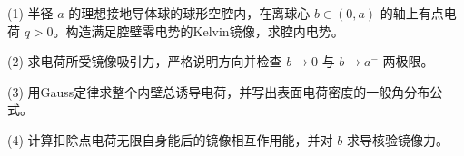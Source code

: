 (1) 半径 \(a\) 的理想接地导体球的球形空腔内，在离球心 \(b\in(0,a)\) 的轴上有点电荷 \(q>0\)。构造满足腔壁零电势的Kelvin镜像，求腔内电势。

(2) 求电荷所受镜像吸引力，严格说明方向并检查 \(b\to0\) 与 \(b\to a^-\) 两极限。

(3) 用Gauss定律求整个内壁总诱导电荷，并写出表面电荷密度的一般角分布公式。

(4) 计算扣除点电荷无限自身能后的镜像相互作用能，并对 \(b\) 求导核验镜像力。
